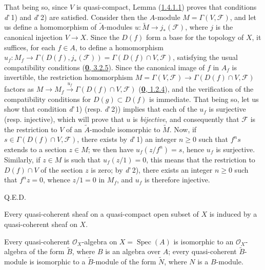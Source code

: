 That being so, since $V$ is quasi-compact, Lemma
(\hyperref[I.1.4.1.1]{1.4.1.1}) proves that conditions
\textit{d}'\,1) and \textit{d}'\,2) are satisfied. Consider then the
$A$-module $M=\Gamma(V,\mathscr{F})$, and let us define a homomorphism of
$\widetilde{A}$-modules $u:\widetilde{M}\to j_*(\mathscr{F})$, where $j$ is
the canonical injection $V\to X$. Since the $D(f)$ form a base for the
topology of $X$, it suffices, for each $f\in A$, to define a
homomorphism
$u_f:M_f\to\Gamma(D(f),j_*(\mathscr{F}))=\Gamma(D(f)\cap V,\mathscr{F})$,
satisfying the usual compatibility conditions
(\hyperref[0.3.2.5]{\textbf{0}, 3.2.5}). Since the canonical image of $f$ in
$A_f$ is invertible, the restriction homomorphism
$M=\Gamma(V,\mathscr{F})\to\Gamma(D(f)\cap V,\mathscr{F})$ factors as
$M\longrightarrow M_f\xrightarrow{u_f}\Gamma(D(f)\cap V,\mathscr{F})$
(\hyperref[0.1.2.4]{\textbf{0}, 1.2.4}), and the verification of the compatibility
conditions for $D(g)\subset D(f)$ is immediate. That being so, let us show
that condition \textit{d}'\,1) (resp. \textit{d}'\,2)) implies that each
of the $u_f$ is surjective (resp. injective), which will prove that $u$ is
\emph{bijective}, and consequently that $\mathscr{F}$ is the restriction to
$V$ of an $\widetilde{A}$-module isomorphic to $\widetilde{M}$. Now, if
$s\in\Gamma(D(f)\cap V,\mathscr{F})$, there exists by \textit{d}'\,1) an
integer $n\geq0$ such that $f^n s$ extends to a section $z\in M$; we then
have $u_f(z/f^n)=s$, hence $u_f$ is surjective. Similarly, if $z\in M$ is
such that $u_f(z/1)=0$, this means that the restriction to $D(f)\cap V$ of
the section $z$ is zero; by \textit{d}'\,2), there exists an integer
$n\geq0$ such that $f^n z=0$, whence $z/1=0$ in $M_f$, and $u_f$ is
therefore injective.

\par\hfill Q.E.D.\par

\begin{corollary}[1.4.2]
\label{I.1.4.2}
Every quasi-coherent sheaf on a quasi-compact open subset of $X$ is induced
by a quasi-coherent sheaf on $X$.
\end{corollary}

\begin{corollary}[1.4.3]
\label{I.1.4.3}
Every quasi-coherent $\mathscr{O}_X$-algebra on
$X=\operatorname{Spec}(A)$ is isomorphic to an $\mathscr{O}_X$-algebra of
the form $\widetilde{B}$, where $B$ is an algebra over $A$; every
quasi-coherent $\widetilde{B}$-module is isomorphic to a
$\widetilde{B}$-module of the form $\widetilde{N}$, where $N$ is a
$B$-module.
\end{corollary}

